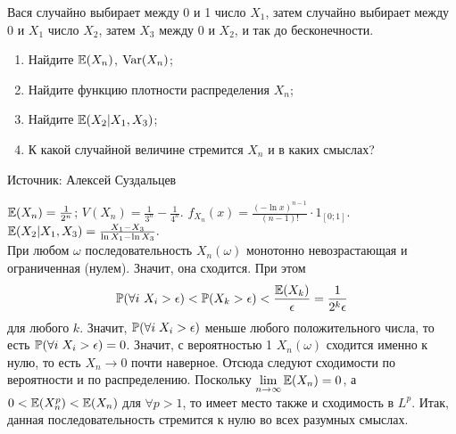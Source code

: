 \begin{problem}
 Вася случайно выбирает между 0 и 1 число $X_1$, затем случайно выбирает между 0 и $X_1$ число $X_2$, затем $X_3$ между 0 и $X_{2}$, и так до бесконечности.
\begin{enumerate}
  \item Найдите $\E(X_n)$, $\Var(X_n)$;
  \item Найдите функцию плотности распределения $X_n$;
  \item Найдите $\E(X_2|X_1,X_3)$;
\item К какой случайной величине стремится $X_n$ и в каких смыслах?
\end{enumerate}

Источник: Алексей Суздальцев

\begin{sol}

$\E(X_n)=\frac{1}{2^n}$; $V(X_n)=\frac{1}{3^n}-\frac{1}{4^n}$. $f_{X_n}(x)=\frac{(-\ln{x})^{n-1}}{(n-1)!}\cdot 1_{[0;1]}.$\\
$\E(X_2|X_1,X_3)=\frac{X_1-X_3}{\ln{X_1}-\ln{X_3}}.$\\
При любом $\omega$ последовательность $X_n(\omega)$ монотонно невозрастающая и ограниченная (нулем). Значит, она сходится. При этом
\[
 \P(\forall i \mbox{ } X_i>\epsilon)<\P(X_k>\epsilon)<\frac{\E(X_k)}{\epsilon}=\frac{1}{2^k\epsilon}
 \]
 для любого $k$. Значит, $\P(\forall i \; X_i>\epsilon)$ меньше любого положительного числа, то есть $\P(\forall i \; X_i>\epsilon)=0$. Значит, с вероятностью 1 $X_n(\omega)$ сходится именно к нулю, то есть $X_n\to 0$ почти наверное. Отсюда следуют сходимости по вероятности и по распределению. Поскольку $\lim\limits_{n\to \infty}\E(X_n)=0$, а $0<\E(X_n^p)<\E(X_n)$ для $\forall p>1$, то имеет место также и сходимость в $L^p$. Итак, данная последовательность стремится к нулю во всех разумных смыслах.
\end{sol}
\end{problem}

